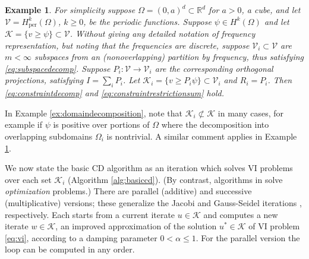 \documentclass[letterpaper,final,12pt,reqno]{amsart}
\theoremstyle{cstyle}
\theoremstyle{cstyle*}
\theoremstyle{dstyle}
\newtheorem{example}[theorem]{Example}
\numberwithin{equation}{section}
\numberwithin{figure}{section}
\numberwithin{table}{section}
\numberwithin{theorem}{section}
\newcommand{\RR}{\mathbb{R}}
\newcommand{\cK}{\mathcal{K}}
\newcommand{\cV}{\mathcal{V}}
\begin{document}
\begin{example}  \label{ex:frequencydecomposition}  For simplicity suppose $\Omega = (0,a)^d \subset \RR^d$ for $a>0$, a cube, and let $\cV = H_{\text{per}}^k(\Omega)$, $k\ge 0$, be the periodic functions.  Suppose $\psi \in H^k(\Omega)$ and let $\cK = \{v \ge \psi\} \subset \cV$.  Without giving any detailed notation of frequency representation, but noting that the frequencies are discrete, suppose $\cV_i \subset \cV$ are $m<\infty$ subspaces from an (nonoverlapping) partition by frequency, thus satisfying \eqref{eq:subspacedecomp}.  Suppose $P_i:\cV \to \cV_i$ are the corresponding orthogonal projections, satisfying $I = \sum_i P_i$.  Let $\cK_i = \{v \ge P_i \psi\} \subset \cV_i$ and $R_i = P_i$.  Then \eqref{eq:constraintdecomp} and \eqref{eq:constraintrestrictionsum} hold.
\end{example}

In Example \ref{ex:domaindecomposition}, note that $\cK_i \not\subset \cK$ in many cases, for example if $\psi$ is positive over portions of $\Omega$ where the decomposition into overlapping subdomains $\Omega_i$ is nontrivial.  A similar comment applies in Example \ref{ex:frequencydecomposition}.

We now state the basic CD algorithm as an iteration which solves VI problems over each set $\cK_i$ (Algorithm \ref{alg:basiccd}).  (By contrast, algorithms in \cite{Tai2003} solve \emph{optimization} problems.)  There are parallel (additive) and successive (multiplicative) versions; these generalize the Jacobi and Gauss-Seidel iterations \cite{Greenbaum1997}, respectively.  Each starts from a current iterate $u \in \cK$ and computes a new iterate $w\in\cK$, an improved approximation of the solution $u^* \in \cK$ of VI problem \eqref{eq:vi}, according to a damping parameter $0<\alpha\le 1$.  For the parallel version the  loop can be computed in any order.
\end{document}
